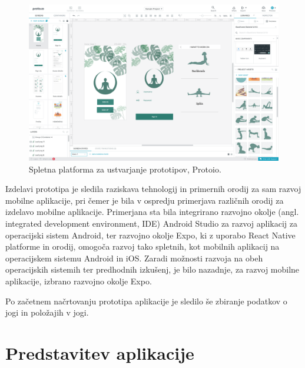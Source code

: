 \documentclass[a4paper, 12pt]{book}
\begin{document}
\begin{figure}[!htbp]
\begin{center}
\includegraphics[scale=.23]{protoio.png}
\end{center}
\caption{Spletna platforma za ustvarjanje prototipov, Protoio.}
\label{protoio}
\end{figure}

Izdelavi prototipa je sledila raziskava tehnologij in primernih orodij za sam razvoj mobilne aplikacije, pri čemer je bila v ospredju primerjava različnih orodij za izdelavo mobilne aplikacije. Primerjana sta bila integrirano razvojno okolje (angl. integrated development environment, IDE) Android Studio za razvoj aplikacij za operacijski sistem Android, ter razvojno okolje Expo, ki z uporabo React Native platforme in orodij, omogoča razvoj tako spletnih, kot mobilnih aplikacij na operacijskem sistemu Android in iOS. Zaradi možnosti razvoja na obeh operacijskih sistemih ter predhodnih izkušenj, je bilo nazadnje, za razvoj mobilne aplikacije, izbrano razvojno okolje Expo.

Po začetnem načrtovanju prototipa aplikacije je sledilo še zbiranje podatkov o jogi in položajih v jogi. 


\chapter{Predstavitev aplikacije}
\label{ch3}
\end{document}
